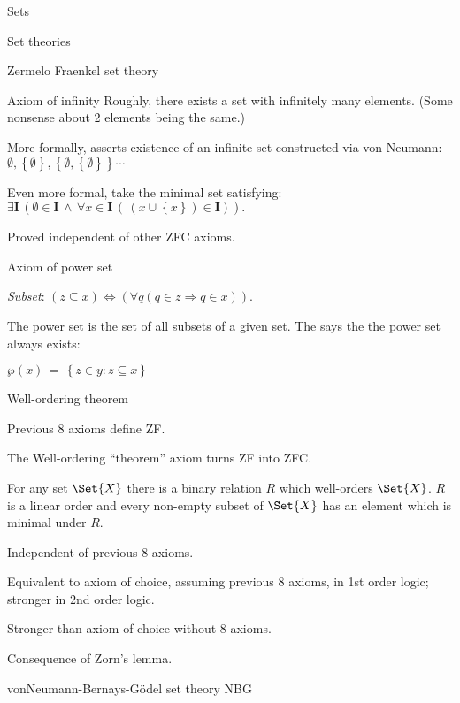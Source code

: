 \begin{plSection}{Sets}
\begin{plSection}{Set theories}
\begin{plSection}{Zermelo Fraenkel set theory}
\begin{plSection}{Axiom of infinity}
Roughly, there exists a set with infinitely many 
elements\cite{wiki:AxiomOfInfinity}.
(Some nonsense about 2 elements being the same.)

More formally, asserts existence of an infinite set 
constructed via von Neumann:
$\emptyset, \left\{\emptyset\right\}, \left\{ \emptyset, \left\{\emptyset\right\} \right\} \cdots$

Even more formal, take the minimal set satisfying:
${\displaystyle 
\exists \mathbf {I}
 \,(\emptyset \in \mathbf {I}
 \,\land \,
 \forall x\in \mathbf {I} \,
 (\,(x\cup \left\{x\right\})\in \mathbf {I} )).}$
 
 Proved independent of other \textsf{ZFC} axioms.
 
\end{plSection}%
\begin{plSection}{Axiom of power set}
\label{sec:Axiom-of-power-set}

\textsl{Subset}:
$(z\subseteq x)
 \Leftrightarrow 
 (\forall q(q\in z\Rightarrow q\in x)).$
 
The power set is the set of all subsets of a given set.
The  says the the power set
always exists\cite{wiki:AxiomOfPowerSet}:

${\displaystyle \wp(x) \,=\, \left\{z\in y:z\subseteq x\right\}}$

\end{plSection}%
\begin{plSection}{Well-ordering theorem}
\label{sec:Well_ordering_theorem}

Previous 8 axioms define \textsf{ZF}.

The Well-ordering ``theorem'' axiom turns \textsf{ZF}
into \textsf{ZFC}\cite{wiki:WellOrderingTheorem}.

For any set $\Set{X}$ there is a binary relation $R$ which
 well-orders $\Set{X}$.
 $R$ is a linear order and every non-empty subset of $\Set{X}$
 has an element which is minimal under $R$.

Independent of previous 8 axioms.

Equivalent to axiom of choice\cite{wiki:AxiomOfChoice}, 
assuming previous 8 axioms, in 1st order logic;
stronger in $2$nd order logic.

Stronger than axiom of choice without 8 axioms.

Consequence of Zorn's lemma\cite{wiki:ZornsLemma}.
\end{plSection}%
\end{plSection}%
\begin{plSection}{vonNeumann-Bernays-G\"{o}del set theory}
\label{vonNeumann-Bernays-Godel_set_theory}
\textsf{NBG}\cite{wiki:NBGSetTheory}


\end{plSection}
\end{plSection}
\end{plSection}
